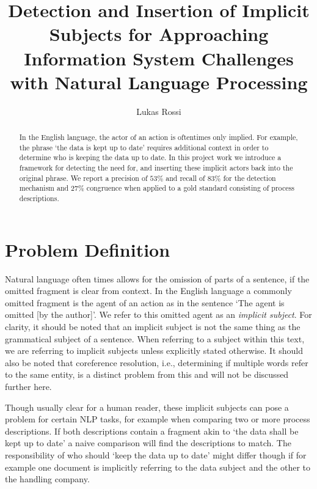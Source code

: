\documentclass[times, 10pt,twocolumn]{article}
\begin{document}
\title{Detection and Insertion of Implicit Subjects for Approaching Information System Challenges with Natural Language Processing}

\author{Lukas Rossi}

\maketitle
\thispagestyle{empty}

\begin{abstract}
   In the English language, the actor of an action is oftentimes only implied.
   For example, the phrase `the data is kept up to date' requires additional context in order
   to determine who is keeping the data up to date. In this project work we introduce
   a framework for detecting the need for, and inserting these implicit actors back into
   the original phrase. We report a precision of \(53\%\) and recall of \(83\%\) for
   the detection mechanism and \(27\%\) congruence when applied to a gold standard consisting
   of process descriptions.
\end{abstract}



\section{Problem Definition}
Natural language often times allows for the omission of parts of a sentence,
if the omitted fragment is clear from context. In the English language a
commonly omitted fragment is the agent of an action as in the sentence
`The agent is omitted [by the author]'. We refer to this omitted agent as
an \textit{implicit subject}. For clarity, it should be noted that an implicit
subject is not the same thing as the grammatical subject of a sentence. When referring
to a subject within this text, we are referring to implicit subjects unless explicitly
stated otherwise. It should
also be noted that coreference resolution, i.e., determining if multiple words
refer to the same entity, is a distinct problem from this and will not be
discussed further here. 

Though usually clear for a human reader, these implicit subjects can pose a problem
for certain NLP tasks, for example when comparing two or more process descriptions.
If both descriptions contain a fragment akin to `the data shall be kept up to date'
a naive comparison will find the descriptions to match. The responsibility of who
should `keep the data up to date' might differ though if for example one document
is implicitly referring to the data subject and the other to the handling company.
\end{document}

